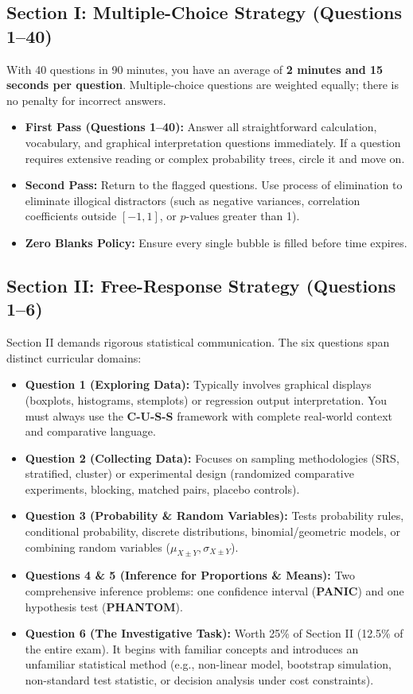 \subsection*{Section I: Multiple-Choice Strategy (Questions 1--40)}
With 40 questions in 90 minutes, you have an average of \textbf{2 minutes and 15 seconds per question}. Multiple-choice questions are weighted equally; there is no penalty for incorrect answers.
\begin{itemize}[leftmargin=1.5em]
  \item \textbf{First Pass (Questions 1--40):} Answer all straightforward calculation, vocabulary, and graphical interpretation questions immediately. If a question requires extensive reading or complex probability trees, circle it and move on.
  \item \textbf{Second Pass:} Return to the flagged questions. Use process of elimination to eliminate illogical distractors (such as negative variances, correlation coefficients outside $[-1, 1]$, or $p$-values greater than 1).
  \item \textbf{Zero Blanks Policy:} Ensure every single bubble is filled before time expires.
\end{itemize}

\subsection*{Section II: Free-Response Strategy (Questions 1--6)}
Section II demands rigorous statistical communication. The six questions span distinct curricular domains:
\begin{itemize}[leftmargin=1.5em]
  \item \textbf{Question 1 (Exploring Data):} Typically involves graphical displays (boxplots, histograms, stemplots) or regression output interpretation. You must always use the \textbf{C-U-S-S} framework with complete real-world context and comparative language.
  \item \textbf{Question 2 (Collecting Data):} Focuses on sampling methodologies (SRS, stratified, cluster) or experimental design (randomized comparative experiments, blocking, matched pairs, placebo controls).
  \item \textbf{Question 3 (Probability \& Random Variables):} Tests probability rules, conditional probability, discrete distributions, binomial/geometric models, or combining random variables ($\mu_{X \pm Y}, \sigma_{X \pm Y}$).
  \item \textbf{Questions 4 \& 5 (Inference for Proportions \& Means):} Two comprehensive inference problems: one confidence interval (\textbf{PANIC}) and one hypothesis test (\textbf{PHANTOM}).
  \item \textbf{Question 6 (The Investigative Task):} Worth 25\% of Section II (12.5\% of the entire exam). It begins with familiar concepts and introduces an unfamiliar statistical method (e.g., non-linear model, bootstrap simulation, non-standard test statistic, or decision analysis under cost constraints).
\end{itemize}

